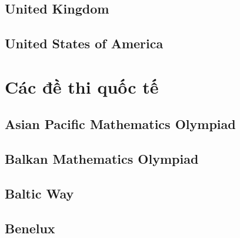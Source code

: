 \documentclass[../the-book.tex]{subfiles}
\begin{document}
\subsection*{United Kingdom}






\subsection*{United States of America}







\newpage

\section{Các đề thi quốc tế}

\subsection*{Asian Pacific Mathematics Olympiad}




\subsection*{Balkan Mathematics Olympiad}









\subsection*{Baltic Way}







\subsection*{Benelux}
\end{document}
